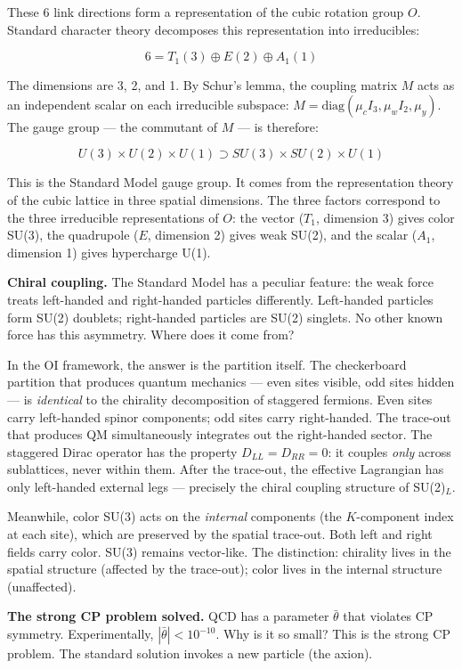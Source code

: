 \documentclass[
]{article}
\begin{document}
These 6 link directions form a representation of the cubic rotation
group \(O\). Standard character theory decomposes this representation
into irreducibles:

\[6 = T_1(3) \oplus E(2) \oplus A_1(1)\]

The dimensions are 3, 2, and 1. By Schur's lemma, the coupling matrix
\(M\) acts as an independent scalar on each irreducible subspace:
\(M = \text{diag}(\mu_c I_3, \mu_w I_2, \mu_y)\). The gauge group ---
the commutant of \(M\) --- is therefore:

\[U(3) \times U(2) \times U(1) \supset SU(3) \times SU(2) \times U(1)\]

This is the Standard Model gauge group. It comes from the representation
theory of the cubic lattice in three spatial dimensions. The three
factors correspond to the three irreducible representations of \(O\):
the vector (\(T_1\), dimension 3) gives color SU(3), the quadrupole
(\(E\), dimension 2) gives weak SU(2), and the scalar (\(A_1\),
dimension 1) gives hypercharge U(1).

\textbf{Chiral coupling.} The Standard Model has a peculiar feature: the
weak force treats left-handed and right-handed particles differently.
Left-handed particles form SU(2) doublets; right-handed particles are
SU(2) singlets. No other known force has this asymmetry. Where does it
come from?

In the OI framework, the answer is the partition itself. The
checkerboard partition that produces quantum mechanics --- even sites
visible, odd sites hidden --- is \emph{identical} to the chirality
decomposition of staggered fermions. Even sites carry left-handed spinor
components; odd sites carry right-handed. The trace-out that produces QM
simultaneously integrates out the right-handed sector. The staggered
Dirac operator has the property \(D_{LL} = D_{RR} = 0\): it couples
\emph{only} across sublattices, never within them. After the trace-out,
the effective Lagrangian has only left-handed external legs ---
precisely the chiral coupling structure of SU(2)\(_L\).

Meanwhile, color SU(3) acts on the \emph{internal} components (the
\(K\)-component index at each site), which are preserved by the spatial
trace-out. Both left and right fields carry color. SU(3) remains
vector-like. The distinction: chirality lives in the spatial structure
(affected by the trace-out); color lives in the internal structure
(unaffected).

\textbf{The strong CP problem solved.} QCD has a parameter
\(\bar{\theta}\) that violates CP symmetry. Experimentally,
\(|\bar{\theta}| < 10^{-10}\). Why is it so small? This is the strong CP
problem. The standard solution invokes a new particle (the axion).
\end{document}
